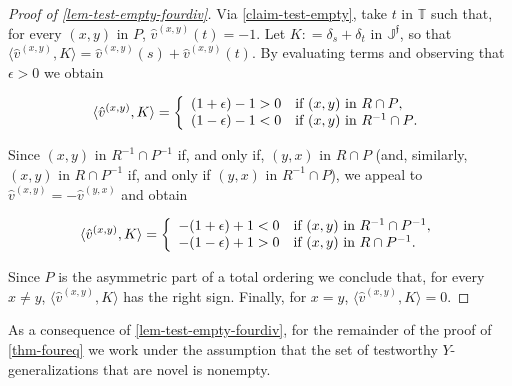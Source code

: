 \documentclass[12pt,a4paper,twoside]{article}
\newcommand{\novel}{\mathfrak f}
\newcommand{\mbbt}{{\mathds {T}}}
\newcommand{\mbbjp}{{\mathds {J}^{\novel}}}
\newcommand{\xy}{{(x, y)}}
\newcommand{\yx}{{(y, x)}}
\begin{document}
\begin{appendices}
\begin{proof}[Proof of \cref{lem-test-empty-fourdiv}]
  Via \cref{claim-test-empty}, take $t$ in $\mbbt$ such that, for every $\xy$
  in $P$, $\hat{v}^{\xy} ( t ) = -1$.  Let $K : = \delta _{s} + \delta _{t }$
  in $\mbbjp$, so that $\langle \hat{v}^{\xy}, K \rangle = \hat{v}^{\xy}(s) +
  \hat{v}^{\xy}(t)$. By evaluating terms and observing that $\epsilon > 0$ we
  obtain
\begin{linenomath*} 
 \begin{equation*}
   \langle \hat{v}^{\xy}, K \rangle = \left \{
      \begin{array}{l l}
        (1+ \epsilon) - 1 > 0 & \text{if $\xy$ in ${R} \cap P $},\\
                 (1- \epsilon) - 1 < 0 & \text{if $\xy$ in ${R}^{-1}\cap P$}.
      \end{array}
    \right.
  \end{equation*}
\end{linenomath*} 
  Since $\xy$ in ${R}^{-1} \cap P^{-1}$ if, and only if, $\yx$ in ${R}\cap P$
  (and, similarly, $\xy$ in ${R} \cap P^{-1}$ if, and only if $\yx$ in
  ${R}^{-1}\cap P$), we appeal to $\hat{v}^{\xy} = - \hat{v}^{\yx}$ and obtain
\begin{linenomath*}
 \begin{equation*}
   \langle \hat{v}^{\xy}, K \rangle = \left \{
      \begin{array}{l l}
        -( 1 + \epsilon) + 1 < 0 & \text{if $\xy$ in ${R}^{-1} \cap P^{-1}$,}\\
        -(1- \epsilon) + 1 > 0 & \text{if $\xy$ in ${R} \cap P^{-1} $.}
      \end{array}
    \right.
  \end{equation*}
\end{linenomath*}
Since $P$ is the asymmetric part of a total ordering we conclude that, for
every $x\neq y$, $\langle \hat{v}^{\xy}, K \rangle$ has the right sign.
Finally, for $x = y$, $\langle \hat{v}^{\xy}, K \rangle = 0$.
\end{proof}

As a consequence of \cref{lem-test-empty-fourdiv}, for the remainder of the
proof of \cref{thm-foureq} we work under the assumption that the set of
testworthy $Y$-{generalization}s that are novel is nonempty. 


\end{appendices}
\end{document}
